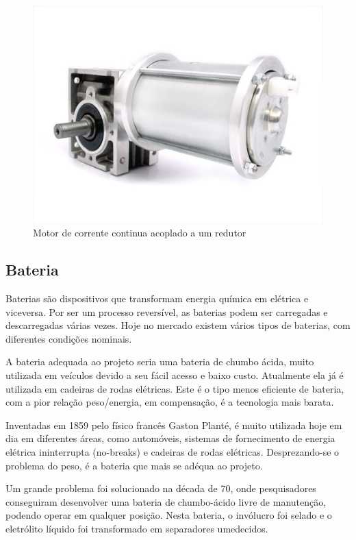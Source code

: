 \begin{figure}[!htb]
	\centering
	\includegraphics[keepaspectratio=true,scale=0.5]{figuras/referencialteorico/motor}
	\caption{Motor de corrente continua acoplado a um redutor}
	\label{motor}
\end{figure}

\subsection{Bateria}

Baterias são dispositivos que transformam energia química em elétrica e viceversa. Por ser um processo reversível, as baterias podem ser carregadas e descarregadas várias vezes. Hoje no mercado existem vários tipos de baterias, com diferentes condições nominais.

A bateria adequada ao projeto seria uma bateria de chumbo ácida, muito utilizada em veículos devido a seu fácil acesso e baixo custo. Atualmente ela já é utilizada em cadeiras de rodas elétricas. Este é o tipo menos eficiente de bateria, com a pior relação peso/energia, em compensação, é a tecnologia mais barata.

Inventadas em 1859 pelo físico francês Gaston Planté, é muito utilizada hoje em dia em diferentes áreas, como automóveis, sistemas de fornecimento de energia elétrica ininterrupta (no-breaks) e cadeiras de rodas elétricas. Desprezando-se o problema do peso, é a bateria que mais se adéqua ao projeto.

Um grande problema foi solucionado na década de 70, onde pesquisadores conseguiram desenvolver uma bateria de chumbo-ácido livre de manutenção, podendo operar em qualquer posição. Nesta bateria, o invólucro foi selado e o eletrólito líquido foi transformado em separadores umedecidos.

